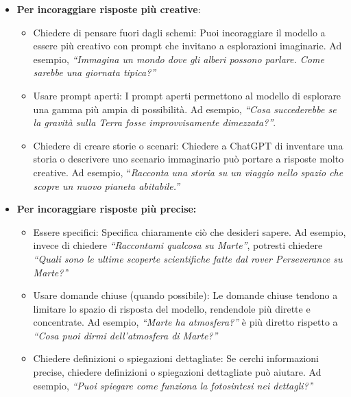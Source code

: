         \begin{itemize}
            \item \textbf{Per incoraggiare risposte più creative}:
            \begin{itemize}
                \item Chiedere di pensare fuori dagli schemi: Puoi incoraggiare il modello a essere più creativo con prompt che invitano a esplorazioni imaginarie. Ad esempio, \textit{``Immagina un mondo dove gli alberi possono parlare. Come sarebbe una giornata tipica?''}

                \item Usare prompt aperti: I prompt aperti permettono al modello di esplorare una gamma più ampia di possibilità. Ad esempio, \textit{``Cosa succederebbe se la gravità sulla Terra fosse improvvisamente dimezzata?''}.
                
                \item Chiedere di creare storie o scenari: Chiedere a ChatGPT di inventare una storia o descrivere uno scenario immaginario può portare a risposte molto creative. Ad esempio, ``\textit{Racconta una storia su un viaggio nello spazio che scopre un nuovo pianeta abitabile.''}
            \end{itemize}

            \item \textbf{Per incoraggiare risposte più precise:}
            \begin{itemize}
                \item Essere specifici: Specifica chiaramente ciò che desideri sapere. Ad esempio, invece di chiedere \textit{``Raccontami qualcosa su Marte''}, potresti chiedere \textit{``Quali sono le ultime scoperte scientifiche fatte dal rover Perseverance su Marte?'}'

                \item Usare domande chiuse (quando possibile): Le domande chiuse tendono a limitare lo spazio di risposta del modello, rendendole più dirette e concentrate. Ad esempio, \textit{``Marte ha atmosfera?''} è più diretto rispetto a \textit{``Cosa puoi dirmi dell'atmosfera di Marte?''}
                
                \item Chiedere definizioni o spiegazioni dettagliate: Se cerchi informazioni precise, chiedere definizioni o spiegazioni dettagliate può aiutare. Ad esempio, \textit{``Puoi spiegare come funziona la fotosintesi nei dettagli?'}'
            \end{itemize}
        \end{itemize}

